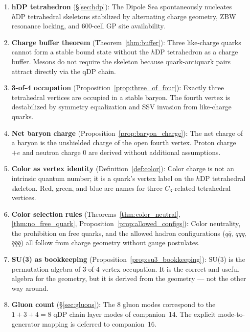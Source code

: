 \documentclass[12pt]{article}
\newcommand{\hDP}{h\mathrm{DP}}
\begin{document}
\begin{enumerate}
\item \textbf{hDP tetrahedron} (§\ref{sec:hdp}): The Dipole Sea
  spontaneously nucleates $\hDP$ tetrahedral skeletons stabilized
  by alternating charge geometry, ZBW resonance locking, and
  600-cell GP site availability.

\item \textbf{Charge buffer theorem} (Theorem~\ref{thm:buffer}):
  Three like-charge quarks cannot form a stable bound state without
  the $\hDP$ tetrahedron as a charge buffer.  Mesons do not require
  the skeleton because quark-antiquark pairs attract directly via
  the qDP chain.

\item \textbf{3-of-4 occupation} (Proposition~\ref{prop:three_of_four}):
  Exactly three tetrahedral vertices are occupied in a stable baryon.
  The fourth vertex is destabilized by symmetry equalization and
  SSV invasion from like-charge quarks.

\item \textbf{Net baryon charge} (Proposition~\ref{prop:baryon_charge}):
  The net charge of a baryon is the unshielded charge of the open
  fourth vertex.  Proton charge $+e$ and neutron charge $0$ are
  derived without additional assumptions.

\item \textbf{Color as vertex identity} (Definition~\ref{def:color}):
  Color charge is not an intrinsic quantum number; it is a quark's
  vertex label on the $\hDP$ tetrahedral skeleton.  Red, green, and
  blue are names for three $C_3$-related tetrahedral vertices.

\item \textbf{Color selection rules} (Theorems~\ref{thm:color_neutral},
  \ref{thm:no_free_quark}, Proposition~\ref{prop:allowed_configs}):
  Color neutrality, the prohibition on free quarks, and the allowed
  hadron configurations ($q\bar{q}$, $qqq$, $\bar{q}\bar{q}\bar{q}$)
  all follow from charge geometry without gauge postulates.

\item \textbf{SU(3) as bookkeeping} (Proposition~\ref{prop:su3_bookkeeping}):
  SU(3) is the permutation algebra of 3-of-4 vertex occupation.
  It is the correct and useful algebra for the geometry, but it is
  derived from the geometry --- not the other way around.

\item \textbf{Gluon count} (§\ref{sec:gluons}): The 8 gluon modes
  correspond to the $1 + 3 + 4 = 8$ qDP chain layer modes of
  companion~14.  The explicit mode-to-generator mapping is deferred
  to companion~16.
\end{enumerate}
\end{document}
